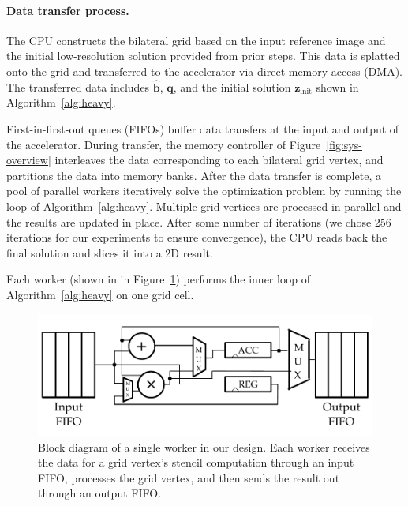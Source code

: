 \paragraph{Data transfer process. }The CPU constructs the bilateral grid based on the input reference image and the initial low-resolution solution provided from prior steps.
This data is splatted onto the grid and transferred to the accelerator via direct memory access (DMA).
The transferred data includes $\hat{\mathbf{b}}$, $\mathbf{q}$, and the initial solution $\mathbf{z}_{\mathrm{init}}$ shown in Algorithm~\ref{alg:heavy}.

First-in-first-out queues (FIFOs) buffer data transfers at the input and output of the accelerator.
During transfer, the memory controller of Figure~\ref{fig:sys-overview} interleaves the data corresponding to each bilateral grid vertex, and partitions the data into memory banks.
After the data transfer is complete, a pool of parallel workers iteratively solve the optimization problem by running the loop of Algorithm~\ref{alg:heavy}.
Multiple grid vertices are processed in parallel and the results are updated in place.
After some number of iterations (we chose 256 iterations for our experiments to ensure convergence), the CPU reads back the final solution and slices it into a 2D result.


Each worker (shown in in Figure~\ref{fig:microarch-single-worker}) performs the inner loop of Algorithm~\ref{alg:heavy} on one grid cell.

\begin{figure}[h]
  \centering
\includegraphics[width=.75\columnwidth]{hfbs-figs/worker_microarchitecture.pdf}

\caption{Block diagram of a single worker in our design.
Each worker receives the data for a grid vertex's stencil computation through an input FIFO, processes the grid vertex, and then sends the result out through an output FIFO.
}
\label{fig:microarch-single-worker}

\end{figure}

